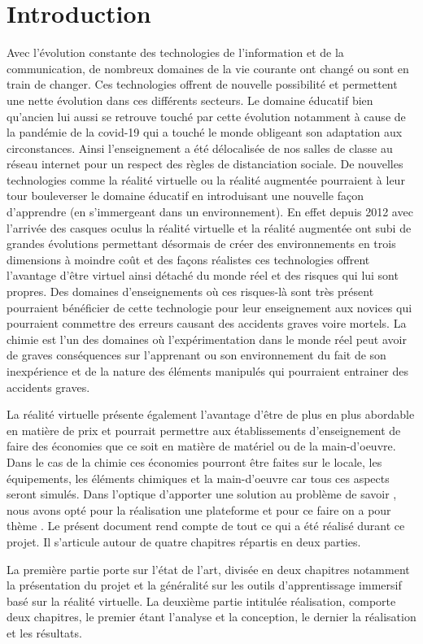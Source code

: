 \chapter*{Introduction}         %

Avec l'évolution constante des technologies de l'information et de la communication, de nombreux domaines de la vie courante ont changé ou sont en train de changer.
Ces technologies offrent de nouvelle possibilité et permettent une nette évolution dans ces différents secteurs.
Le domaine éducatif bien qu'ancien lui aussi se retrouve touché par cette évolution notamment à cause de la pandémie de la covid-19 qui a touché le monde obligeant son adaptation aux circonstances. 
Ainsi l'enseignement a été délocalisée de nos salles de classe au réseau internet pour un respect des règles de distanciation sociale.
De nouvelles technologies comme la réalité virtuelle ou la réalité augmentée pourraient à leur tour bouleverser le domaine éducatif en introduisant une nouvelle façon d'apprendre (en s'immergeant dans un environnement).
En effet depuis 2012 avec l'arrivée des casques oculus la réalité virtuelle et la réalité augmentée ont subi de grandes évolutions permettant désormais de créer des environnements en trois dimensions à moindre coût et des façons réalistes ces technologies offrent l'avantage d'être virtuel ainsi détaché du monde réel et des risques qui lui sont propres.
Des domaines d'enseignements où ces risques-là sont très présent pourraient bénéficier de cette technologie pour leur enseignement aux novices qui pourraient commettre des erreurs causant des accidents graves voire mortels.
La chimie est l'un des domaines où l'expérimentation dans le monde réel peut avoir de graves conséquences sur l'apprenant ou son environnement du fait de son inexpérience et de la nature des éléments manipulés qui pourraient entrainer des accidents graves.

La réalité virtuelle présente également l'avantage d'être de plus en plus abordable en matière de prix et pourrait permettre aux établissements d'enseignement de faire des économies que ce soit en matière de matériel ou de la main-d'oeuvre.
Dans le cas de la chimie ces économies pourront être faites sur le locale, les équipements, les éléments chimiques et la main-d'oeuvre car tous ces aspects seront simulés.
Dans l'optique d'apporter une solution au problème de savoir \og \pb \fg, nous avons opté pour la réalisation une plateforme et pour ce faire on a pour thème \og \theme \fg.
Le présent document rend compte de tout ce qui a été réalisé durant ce projet. Il s’articule autour de quatre chapitres répartis en deux parties.

La première partie porte sur l’état de l’art, divisée en deux chapitres notamment la présentation du projet et la généralité sur les outils d'apprentissage immersif basé sur la réalité virtuelle.
La deuxième partie intitulée réalisation, comporte deux chapitres, le premier étant l’analyse et la conception, le dernier la réalisation et les résultats.

